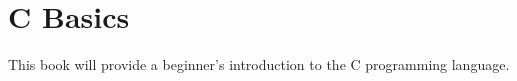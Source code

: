 \section{C Basics}
\par This book will provide a beginner's introduction to the C programming language.
\begin{center}
    
\end{center}
